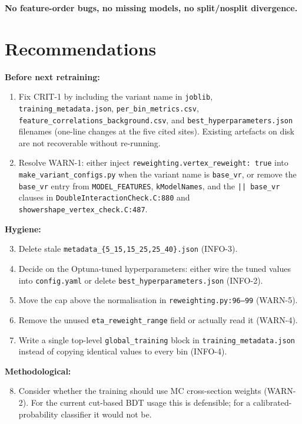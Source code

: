 \documentclass[11pt,a4paper]{article}
\begin{document}
\textbf{No feature-order bugs, no missing models, no split/nosplit
divergence.}

\section{Recommendations}

\textbf{Before next retraining:}
\begin{enumerate}
\item Fix CRIT-1 by including the variant name in \texttt{joblib},
  \texttt{training\_metadata.json}, \texttt{per\_bin\_metrics.csv},
  \texttt{feature\_correlations\_background.csv}, and
  \texttt{best\_hyperparameters.json} filenames (one-line changes at the
  five cited sites). Existing artefacts on disk are not recoverable
  without re-running.
\item Resolve WARN-1: either inject
  \texttt{reweighting.vertex\_reweight: true} into
  \texttt{make\_variant\_configs.py} when the variant name is
  \texttt{base\_vr}, or remove the \texttt{base\_vr} entry from
  \texttt{MODEL\_FEATURES}, \texttt{kModelNames}, and the \texttt{||
  base\_vr} clauses in \texttt{DoubleInteractionCheck.C:880} and
  \texttt{showershape\_vertex\_check.C:487}.
\end{enumerate}

\textbf{Hygiene:}
\begin{enumerate}\setcounter{enumi}{2}
\item Delete stale \texttt{metadata\_\{5\_15,15\_25,25\_40\}.json}
  (INFO-3).
\item Decide on the Optuna-tuned hyperparameters: either wire the
  tuned values into \texttt{config.yaml} or delete
  \texttt{best\_hyperparameters.json} (INFO-2).
\item Move the cap above the normalisation in
  \texttt{reweighting.py:96--99} (WARN-5).
\item Remove the unused \texttt{eta\_reweight\_range} field or
  actually read it (WARN-4).
\item Write a single top-level \texttt{global\_training} block in
  \texttt{training\_metadata.json} instead of copying identical values
  to every bin (INFO-4).
\end{enumerate}

\textbf{Methodological:}
\begin{enumerate}\setcounter{enumi}{7}
\item Consider whether the training should use MC cross-section
  weights (WARN-2). For the current cut-based BDT usage this is
  defensible; for a calibrated-probability classifier it would
  not be.
\end{enumerate}
\end{document}
